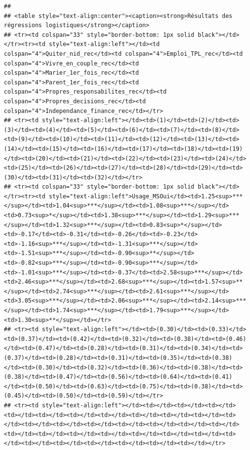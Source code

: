 \documentclass[
]{article}
\begin{document}
\begin{verbatim}
## 
## <table style="text-align:center"><caption><strong>Résultats des régressions logistiques</strong></caption>
## <tr><td colspan="33" style="border-bottom: 1px solid black"></td></tr><tr><td style="text-align:left"></td><td colspan="4">Quiter_nid_rec</td><td colspan="4">Emploi_TPL_rec</td><td colspan="4">Vivre_en_couple_rec</td><td colspan="4">Marier_1er_fois_rec</td><td colspan="4">Parent_1er_fois_rec</td><td colspan="4">Propres_responsabilites_rec</td><td colspan="4">Propres_decisions_rec</td><td colspan="4">Independance_finance_rec</td></tr>
## <tr><td style="text-align:left"></td><td>(1)</td><td>(2)</td><td>(3)</td><td>(4)</td><td>(5)</td><td>(6)</td><td>(7)</td><td>(8)</td><td>(9)</td><td>(10)</td><td>(11)</td><td>(12)</td><td>(13)</td><td>(14)</td><td>(15)</td><td>(16)</td><td>(17)</td><td>(18)</td><td>(19)</td><td>(20)</td><td>(21)</td><td>(22)</td><td>(23)</td><td>(24)</td><td>(25)</td><td>(26)</td><td>(27)</td><td>(28)</td><td>(29)</td><td>(30)</td><td>(31)</td><td>(32)</td></tr>
## <tr><td colspan="33" style="border-bottom: 1px solid black"></td></tr><tr><td style="text-align:left">Usage_MSOui</td><td>1.25<sup>***</sup></td><td>1.04<sup>***</sup></td><td>1.08<sup>***</sup></td><td>0.73<sup>*</sup></td><td>1.38<sup>***</sup></td><td>1.29<sup>***</sup></td><td>1.32<sup>***</sup></td><td>0.83<sup>*</sup></td><td>-0.17</td><td>-0.31</td><td>-0.26</td><td>-0.23</td><td>-1.16<sup>***</sup></td><td>-1.31<sup>***</sup></td><td>-1.51<sup>***</sup></td><td>-0.90<sup>**</sup></td><td>-0.82<sup>***</sup></td><td>-0.90<sup>***</sup></td><td>-1.01<sup>***</sup></td><td>-0.37</td><td>2.58<sup>***</sup></td><td>2.46<sup>***</sup></td><td>2.68<sup>***</sup></td><td>1.57<sup>**</sup></td><td>2.74<sup>***</sup></td><td>2.61<sup>***</sup></td><td>3.05<sup>***</sup></td><td>2.06<sup>***</sup></td><td>2.14<sup>***</sup></td><td>1.74<sup>***</sup></td><td>1.79<sup>***</sup></td><td>1.30<sup>**</sup></td></tr>
## <tr><td style="text-align:left"></td><td>(0.30)</td><td>(0.33)</td><td>(0.37)</td><td>(0.42)</td><td>(0.32)</td><td>(0.38)</td><td>(0.46)</td><td>(0.47)</td><td>(0.28)</td><td>(0.31)</td><td>(0.34)</td><td>(0.37)</td><td>(0.28)</td><td>(0.31)</td><td>(0.35)</td><td>(0.38)</td><td>(0.30)</td><td>(0.32)</td><td>(0.36)</td><td>(0.38)</td><td>(0.38)</td><td>(0.47)</td><td>(0.56)</td><td>(0.64)</td><td>(0.41)</td><td>(0.50)</td><td>(0.63)</td><td>(0.75)</td><td>(0.38)</td><td>(0.45)</td><td>(0.50)</td><td>(0.59)</td></tr>
## <tr><td style="text-align:left"></td><td></td><td></td><td></td><td></td><td></td><td></td><td></td><td></td><td></td><td></td><td></td><td></td><td></td><td></td><td></td><td></td><td></td><td></td><td></td><td></td><td></td><td></td><td></td><td></td><td></td><td></td><td></td><td></td><td></td><td></td><td></td><td></td></tr>

\end{verbatim}
\end{document}
